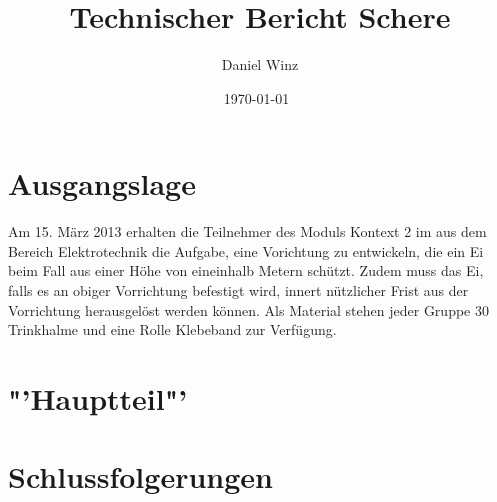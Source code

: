 \documentclass[a4paper,10pt,fleqn]{article}
\title{Technischer Bericht Schere}
\author{Daniel Winz}
\date{\today~\dtc}
\begin{document}
\maketitle

% 

\tableofcontents
\newpage

% 
\section{Ausgangslage}
Am 15. März 2013 erhalten die Teilnehmer des Moduls Kontext 2 im aus dem 
Bereich Elektrotechnik die Aufgabe, eine Vorichtung zu entwickeln, die ein Ei 
beim Fall aus einer Höhe von eineinhalb Metern schützt. Zudem muss das Ei, 
falls es an obiger Vorrichtung befestigt wird, innert nützlicher Frist aus der 
Vorrichtung herausgelöst werden können. Als Material stehen jeder Gruppe 30 
Trinkhalme und eine Rolle Klebeband zur Verfügung. %

\section{"'Hauptteil"'}


\section{Schlussfolgerungen}
\end{document}
